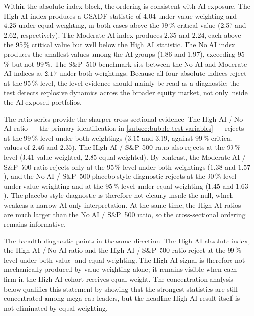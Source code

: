 Within the absolute-index block, the ordering is consistent with AI exposure. The High AI index produces a GSADF statistic of $4.04$ under value-weighting and $4.25$ under equal-weighting, in both cases above the 99\,\% critical value (\num{2.57} and \num{2.62}, respectively). The Moderate AI index produces $2.35$ and $2.24$, each above the 95\,\% critical value but well below the High AI statistic. The No AI index produces the smallest values among the AI groups ($1.86$ and $1.97$), exceeding 95\,\% but not 99\,\%. The S\&P~500 benchmark sits between the No AI and Moderate AI indices at $2.17$ under both weightings. Because all four absolute indices reject at the 95\,\% level, the level evidence should mainly be read as a diagnostic: the test detects explosive dynamics across the broader equity market, not only inside the AI-exposed portfolios.
 
The ratio series provide the sharper cross-sectional evidence. The High AI / No AI ratio --- the primary identification in \cref{subsec:bubble-test-variables} --- rejects at the 99\,\% level under both weightings ($3.15$ and $3.19$, against 99\,\% critical values of $2.46$ and $2.35$). The High AI / S\&P~500 ratio also rejects at the 99\,\% level ($3.41$ value-weighted, $2.85$ equal-weighted). By contrast, the Moderate AI / S\&P~500 ratio rejects only at the 95\,\% level under both weightings ($1.38$ and $1.57$), and the No AI / S\&P~500 placebo-style diagnostic rejects at the 90\,\% level under value-weighting and at the 95\,\% level under equal-weighting ($1.45$ and $1.63$). The placebo-style diagnostic is therefore not cleanly inside the null, which weakens a narrow AI-only interpretation. At the same time, the High AI ratios are much larger than the No AI / S\&P~500 ratio, so the cross-sectional ordering remains informative.
 
The breadth diagnostic points in the same direction. The High AI absolute index, the High AI / No AI ratio and the High AI / S\&P~500 ratio reject at the 99\,\% level under both value- and equal-weighting. The High-AI signal is therefore not mechanically produced by value-weighting alone; it remains visible when each firm in the High-AI cohort receives equal weight. The concentration analysis below qualifies this statement by showing that the strongest statistics are still concentrated among mega-cap leaders, but the headline High-AI result itself is not eliminated by equal-weighting.
 
